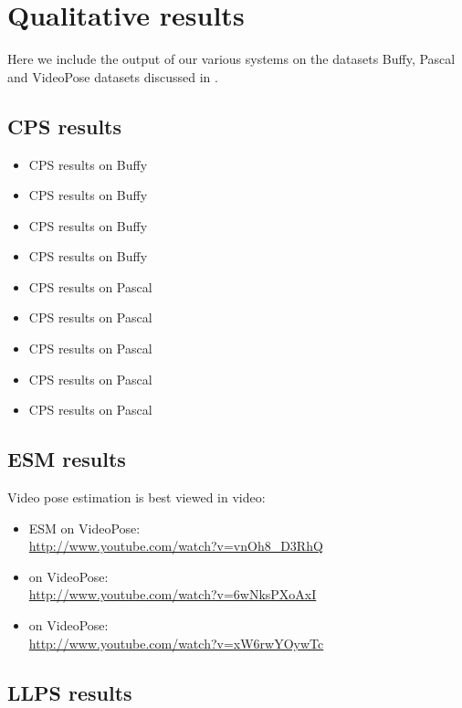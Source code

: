 \chapter{Qualitative results}\label{sec:qual-res}

Here we include the output of our various systems on the datasets Buffy, Pascal 
and VideoPose datasets discussed in .

\section{CPS results}
\begin{itemize}
\item CPS results on Buffy 
\item CPS results on Buffy 
\item CPS results on Buffy 
\item CPS results on Buffy 

\item CPS results on Pascal 
\item CPS results on Pascal 
\item CPS results on Pascal 
\item CPS results on Pascal 
\item CPS results on Pascal 
\end{itemize}

\section{ESM results}

Video pose estimation is best viewed in video:  

\begin{itemize}
\item ESM on VideoPose: \\
\url{http://www.youtube.com/watch?v=vnOh8_D3RhQ}
\item \citet{deva2011} on VideoPose: \\
\url{http://www.youtube.com/watch?v=6wNksPXoAxI}
\item \citet{eichner09} on VideoPose: \\
\url{http://www.youtube.com/watch?v=xW6rwYOywTc}
\end{itemize}

\section{LLPS results}

